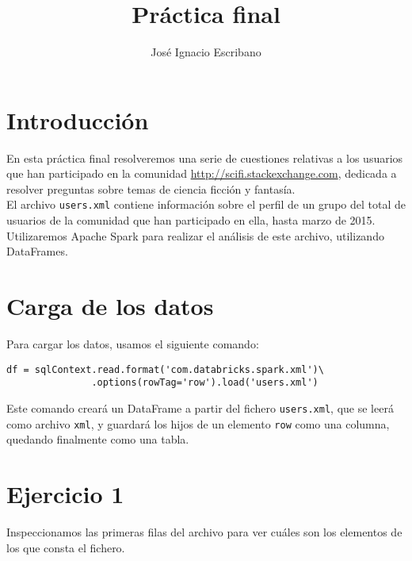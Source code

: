 \documentclass[12pt,a4paper,twoside,openright,titlepage,final]{article}
\author{José Ignacio Escribano}
\title{Práctica final}
\begin{document}
\setcounter{page}{1}


\listoftables
\thispagestyle{empty}
\newpage

\tableofcontents
\thispagestyle{empty}
\newpage


\setcounter{page}{1}

\section{Introducción}

En esta práctica final resolveremos una serie de cuestiones relativas a los usuarios que han participado en la comunidad \url{http://scifi.stackexchange.com}, dedicada a resolver preguntas sobre temas de ciencia ficción y fantasía.\\

El archivo \texttt{users.xml} contiene información sobre el perfil de un grupo del total de usuarios de la comunidad que han participado en ella, hasta marzo de 2015.\\

Utilizaremos Apache Spark para realizar el análisis de este archivo, utilizando DataFrames.

\section{Carga de los datos}

Para cargar los datos, usamos el siguiente comando:

\begin{verbatim}
df = sqlContext.read.format('com.databricks.spark.xml')\
               .options(rowTag='row').load('users.xml')
\end{verbatim}

Este comando creará un DataFrame a partir del fichero \texttt{users.xml}, que se leerá como archivo \texttt{xml}, y guardará los hijos de un elemento \texttt{row} como una columna, quedando finalmente como una tabla.

\section{Ejercicio 1}

Inspeccionamos las primeras filas del archivo para ver cuáles son los elementos de los que consta el fichero.
\end{document}

